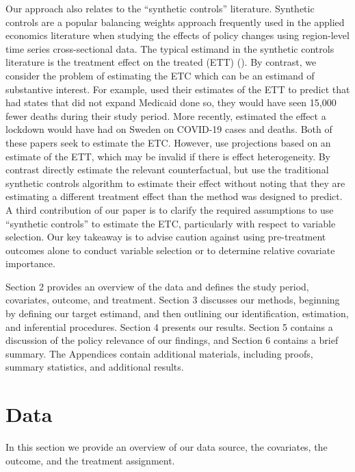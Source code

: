 \documentclass[aoas]{imsart}
\theoremstyle{plain}
\theoremstyle{remark}
\begin{document}
Our approach also relates to the ``synthetic controls'' literature. Synthetic controls are a popular balancing weights approach frequently used in the applied economics literature when studying the effects of policy changes using region-level time series cross-sectional data. The typical estimand in the synthetic controls literature is the treatment effect on the treated (ETT) (\cite{abadie2010synthetic}). By contrast, we consider the problem of estimating the ETC which can be an estimand of substantive interest. For example, \cite{miller2019medicaid} used their estimates of the ETT to predict that had states that did not expand Medicaid done so, they would have seen 15,000 fewer deaths during their study period. More recently, \cite{born2020lockdowns} estimated the effect a lockdown would have had on Sweden on COVID-19 cases and deaths. Both of these papers seek to estimate the ETC. However, \cite{miller2019medicaid} use projections based on an estimate of the ETT, which may be invalid if there is effect heterogeneity. By contrast \cite{born2020lockdowns} directly estimate the relevant counterfactual, but use the traditional synthetic controls algorithm to estimate their effect without noting that they are estimating a different treatment effect than the method was designed to predict. A third contribution of our paper is to clarify the required assumptions to use ``synthetic controls'' to estimate the ETC, particularly with respect to variable selection. Our key takeaway is to advise caution against using pre-treatment outcomes alone to conduct variable selection or to determine relative covariate importance. 

Section 2 provides an overview of the data and defines the study period, covariates, outcome, and treatment. Section 3 discusses our methods, beginning by defining our target estimand, and then outlining our identification, estimation, and inferential procedures. Section 4 presents our results. Section 5 contains a discussion of the policy relevance of our findings, and Section 6 contains a brief summary. The Appendices contain additional materials, including proofs, summary statistics, and additional results.

\section{Data}

In this section we provide an overview of our data source, the covariates, the outcome, and the treatment assignment.
\end{document}
